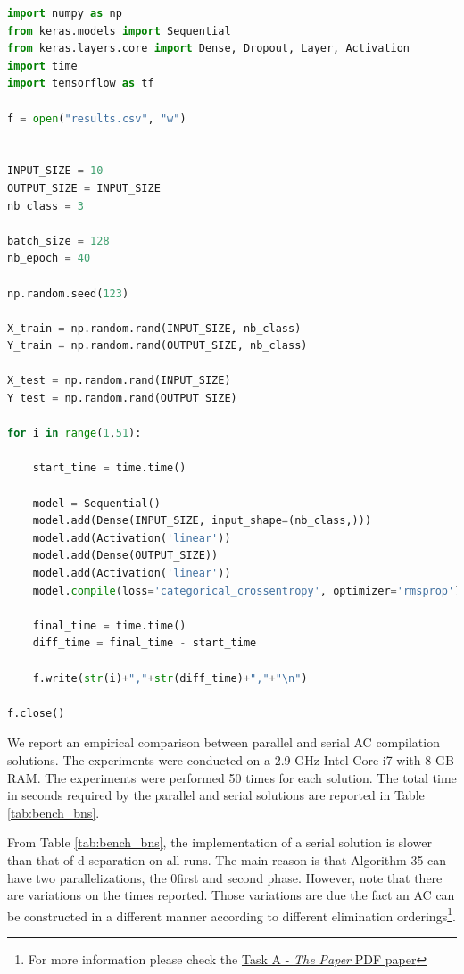 \documentclass[twoside,11pt]{article}
\begin{document}
\begin{lstlisting}[language=python]
import numpy as np
from keras.models import Sequential
from keras.layers.core import Dense, Dropout, Layer, Activation
import time
import tensorflow as tf

f = open("results.csv", "w")


INPUT_SIZE = 10
OUTPUT_SIZE = INPUT_SIZE
nb_class = 3

batch_size = 128
nb_epoch = 40

np.random.seed(123)

X_train = np.random.rand(INPUT_SIZE, nb_class)
Y_train = np.random.rand(OUTPUT_SIZE, nb_class)

X_test = np.random.rand(INPUT_SIZE)
Y_test = np.random.rand(OUTPUT_SIZE)

for i in range(1,51):

    start_time = time.time()

    model = Sequential()
    model.add(Dense(INPUT_SIZE, input_shape=(nb_class,)))
    model.add(Activation('linear'))
    model.add(Dense(OUTPUT_SIZE))
    model.add(Activation('linear'))
    model.compile(loss='categorical_crossentropy', optimizer='rmsprop')

    final_time = time.time()
    diff_time = final_time - start_time

    f.write(str(i)+","+str(diff_time)+","+"\n")

f.close() 
\end{lstlisting}
 

We report an empirical comparison between parallel and serial AC compilation solutions.
The experiments were conducted on a 2.9 GHz Intel Core i7 with 8 GB RAM.
The experiments were performed 50 times for each solution.
The total time in seconds required by the parallel and serial solutions are reported in Table \ref{tab:bench_bns}.

From Table \ref{tab:bench_bns}, the implementation of a serial solution is slower than that of d-separation on all runs.
The main reason is that Algorithm 35 can have two parallelizations, the  0first and second phase.
However, note that there are variations on the times reported.
Those variations are due the fact an AC can be constructed in a different manner according to different elimination orderings\footnote{
For more information please check the \href{https://github.com/andreeds/cs807-research-tasks/blob/master/A\%20-\%20The\%20Paper/Paper/Task_A_Andre_200334126.pdf}{Task A - \emph{The Paper} PDF paper}}.
\end{document}

